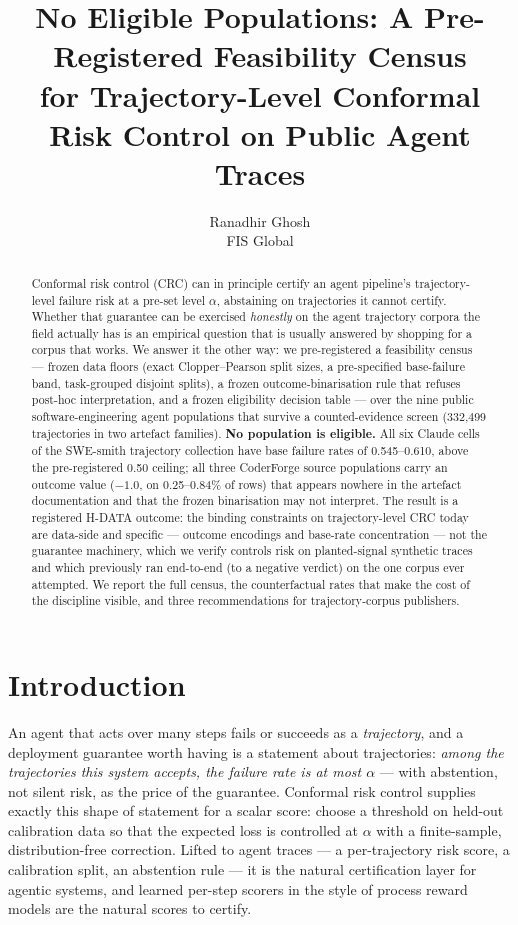 \documentclass[11pt]{article}
\title{No Eligible Populations: A Pre-Registered Feasibility Census\\ for Trajectory-Level Conformal Risk Control on Public Agent Traces}
\author{Ranadhir Ghosh\\ FIS Global}
\date{}
\begin{document}
\maketitle

\begin{abstract}
Conformal risk control (CRC) can in principle certify an agent
pipeline's trajectory-level failure risk at a pre-set level
$\alpha$, abstaining on trajectories it cannot certify. Whether
that guarantee can be exercised \emph{honestly} on the agent
trajectory corpora the field actually has is an empirical
question that is usually answered by shopping for a corpus that
works. We answer it the other way: we pre-registered a
feasibility census --- frozen data floors (exact Clopper--Pearson
split sizes, a pre-specified base-failure band, task-grouped
disjoint splits), a frozen outcome-binarisation rule that
refuses post-hoc interpretation, and a frozen eligibility
decision table --- over the nine public software-engineering
agent populations that survive a counted-evidence screen
(332{,}499 trajectories in two artefact families). \textbf{No
population is eligible.} All six Claude cells of the SWE-smith
trajectory collection have base failure rates of 0.545--0.610,
above the pre-registered 0.50 ceiling; all three CoderForge
source populations carry an outcome value ($-1.0$, on
0.25--0.84\% of rows) that appears nowhere in the artefact
documentation and that the frozen binarisation may not
interpret. The result is a registered H-DATA outcome: the
binding constraints on trajectory-level CRC today are data-side
and specific --- outcome encodings and base-rate concentration
--- not the guarantee machinery, which we verify controls risk
on planted-signal synthetic traces and which previously ran
end-to-end (to a negative verdict) on the one corpus ever
attempted. We report the full census, the counterfactual rates
that make the cost of the discipline visible, and three
recommendations for trajectory-corpus publishers.
\end{abstract}

\section{Introduction}

An agent that acts over many steps fails or succeeds as a
\emph{trajectory}, and a deployment guarantee worth having is a
statement about trajectories: \emph{among the trajectories this
system accepts, the failure rate is at most $\alpha$} --- with
abstention, not silent risk, as the price of the guarantee.
Conformal risk control \citep{angelopoulos2022conformal}
supplies exactly this shape of statement for a scalar score:
choose a threshold on held-out calibration data so that the
expected loss is controlled at $\alpha$ with a finite-sample,
distribution-free correction. Lifted to agent traces --- a
per-trajectory risk score, a calibration split, an abstention
rule --- it is the natural certification layer for agentic
systems, and learned per-step scorers in the style of process
reward models \citep{lightman2023verify, wang2024mathshepherd,
xi2025agentprm} are the natural scores to certify.
\end{document}
